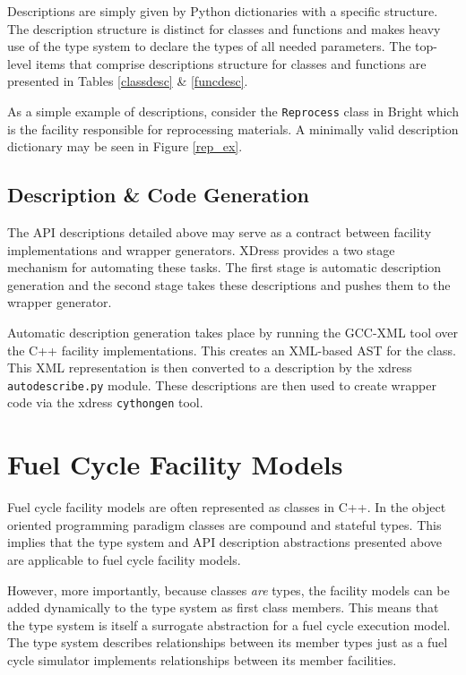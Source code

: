 \documentclass{ansconfpaper}
\newcommand{\vin}[1]{\texttt{{#1}}}
\begin{document}
Descriptions are simply given by Python dictionaries with a specific structure.
The description structure is distinct for classes and functions and makes heavy 
use of the type system to declare the types of all needed parameters.  The top-level
items that comprise descriptions structure for classes and functions are presented 
in Tables \ref{classdesc} \& \ref{funcdesc}.

As a simple example of descriptions, consider the \vin{Reprocess} class in Bright 
which is the facility responsible for reprocessing materials. A minimally valid 
description dictionary may be seen in Figure \ref{rep_ex}. 

\subsection{Description \& Code Generation}
\label{sec:autodesc}

The API descriptions detailed above may serve as a contract between facility 
implementations and wrapper generators.  XDress provides a two stage mechanism 
for automating these tasks.  The first stage is automatic description generation 
and the second stage takes these descriptions and pushes them to the wrapper 
generator.  

Automatic description generation takes place by running the GCC-XML
tool \cite{gccxml} over the C++ facility implementations.  This creates an XML-based
AST for the class.  This XML representation \cite{xml} is then converted to a 
description by the xdress \vin{autodescribe.py} module.  These descriptions are
then used to create wrapper code via the xdress \vin{cythongen} tool.


\section{Fuel Cycle Facility Models}
\label{sec:fc}

Fuel cycle facility models are often represented as classes in C++. In the object
oriented programming paradigm classes are compound and stateful types.  This implies 
that the type system and API description abstractions presented above are applicable
to fuel cycle facility models.  

However, more importantly, because classes \emph{are} types, the facility models 
can be added dynamically to the type system as first class members.  This means
that the type system is itself a surrogate abstraction for a fuel cycle execution 
model.  The type system describes relationships between its member types just as 
a fuel cycle simulator implements relationships between its member facilities.
\end{document}
